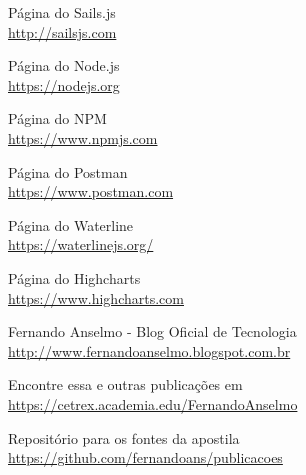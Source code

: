 \documentclass[a4paper,11pt]{article}
\begin{document}
\begin{thebibliography}{9}
  Página do Sails.js \\
  \url{http://sailsjs.com}
  
  Página do Node.js \\
  \url{https://nodejs.org}
  
  Página do NPM \\
  \url{https://www.npmjs.com} 
  
  Página do Postman \\
  \url{https://www.postman.com}

  Página do Waterline \\
  \url{https://waterlinejs.org/}

  Página do Highcharts \\
  \url{https://www.highcharts.com}

  Fernando Anselmo - Blog Oficial de Tecnologia \\
  \url{http://www.fernandoanselmo.blogspot.com.br}

  Encontre essa e outras publicações em \\
  \url{https://cetrex.academia.edu/FernandoAnselmo}

  Repositório para os fontes da apostila \\
  \url{https://github.com/fernandoans/publicacoes}
\end{thebibliography}
  
\end{document}
